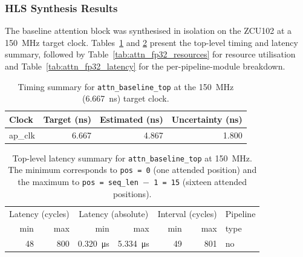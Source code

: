 \subsubsection{HLS Synthesis Results}
\label{subsubsec:attn_fp32_csyn}

The baseline attention block was synthesised in isolation on the ZCU102
at a \SI{150}{\mega\hertz} target clock. Tables~\ref{tab:attn_fp32_timing} and
\ref{tab:attn_fp32_top_latency} present the top-level timing and
latency summary, followed by Table~\ref{tab:attn_fp32_resources} for
resource utilisation and Table~\ref{tab:attn_fp32_latency} for the
per-pipeline-module breakdown.

\begin{table}[H]
  \centering
  \begin{tabular}{lrrr}
    \toprule
    Clock   & Target (ns) & Estimated (ns) & Uncertainty (ns) \\
    \midrule
    ap\_clk & 6.667       & 4.867          & 1.800 \\
    \bottomrule
  \end{tabular}
  \caption{Timing summary for \texttt{attn\_baseline\_top} at the
           \SI{150}{\mega\hertz} (\SI{6.667}{\nano\second}) target clock.}
  \label{tab:attn_fp32_timing}
\end{table}

\begin{table}[H]
  \centering
  \begin{tabular}{rrrrrrl}
    \toprule
    \multicolumn{2}{c}{Latency (cycles)} &
    \multicolumn{2}{c}{Latency (absolute)} &
    \multicolumn{2}{c}{Interval (cycles)} & Pipeline \\
    min & max & min & max & min & max & type \\
    \midrule
    48 & 800 & \SI{0.320}{\micro\second} & \SI{5.334}{\micro\second} & 49 & 801 & no \\
    \bottomrule
  \end{tabular}
  \caption{Top-level latency summary for \texttt{attn\_baseline\_top}
           at \SI{150}{\mega\hertz}. The minimum corresponds to
           \texttt{pos\,=\,0} (one attended position) and the maximum to
           \texttt{pos\,=\,seq\_len\,$-$\,1\,=\,15} (sixteen attended positions).}
  \label{tab:attn_fp32_top_latency}
\end{table}

